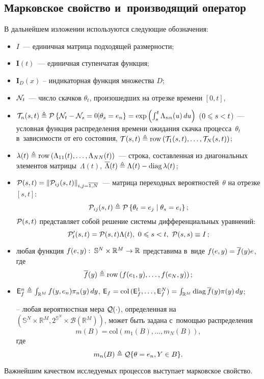 \begin{multicols}{2}
\section{Марковское свойство и~производящий оператор}

В дальнейшем изложении используются следующие обозначения:
\begin{itemize}
\item
$I$~--- единичная матрица подходящей раз\-мер\-ности;
\item
$\mathbf{I}(t)$~--- единичная ступенчатая функция;
\item
$\mathbf{I}_{D}(x)$ -- индикаторная функция множества $D$;
\item
${\mathcal N}_t$~--- число скачков $\theta_t$, произошедших на отрезке времени $[0,t]$,
\item
$\mathcal{T}_n(s,t) \ebd \pp{\NII_t-\NII_s=0|\theta_s=e_n} \hm= \exp \left( \int\nolimits_s^t 
\Lambda_{nn}(u)\,du\right)$ ($0 \hm\leqslant s \hm< t$)~--- условная функция 
распределения времени ожидания скачка процесса~$\theta_t$ в~зависимости от его 
состояния, $\mathcal{T}(s,t) \hm\ebd \mathrm{row}\, (\mathcal{T}_1(s,t),\ldots,\mathcal{T}_N(s,t))$;
\item
$\lambda(t) \triangleq \mathrm{row}\, (\Lambda_{11}(t),\ldots,\Lambda_{NN}(t))$~--- строка, 
составленная из диагональных элементов матрицы~$\Lambda(t)$, 
$\overline{\Lambda}(t) \ebd \Lambda(t) \hm- \mathrm{diag}\, \lambda(t)$;
\item
${\mathcal P}(s,t) = \|{\mathcal P}_{ij}(s,t)\|_{i,j=\overline{1,N}}$~--- матрица переходных 
вероятностей~$\theta$ на отрезке $[s,t]$:
$$
{\mathcal P}_{ij}(s,t) \triangleq \mathcal{P}\left\{ \theta_t=e_j\; | \; \theta_s=e_i \right\};
$$
 ${\mathcal P}(s,t)$ 
представляет собой решение системы дифференциальных уравнений: 
$$
{\mathcal P}'_t(s,t)= {\mathcal P}(s,t)\Lambda(t),\ 0\leqslant s < t,\ {\mathcal P}(s,s) \equiv I\,;
$$
\item
любая функция $f(e,y):\; \mathbb{S}^N \times  \mathbb{R}^M \hm\to \mathbb{R}$ 
представима в~виде $f(e,y) \hm= \overline{f}(y)e$, где
$$
\overline{f}(y) \triangleq \mathrm{row}\left(f(e_1,y), \ldots, f(e_N,y)\right);
$$
\item
$ {\sf E}_f^n \triangleq \int_{\mathbb{R}^M} f(y,e_n) \pi_n(y)\,dy$, 
${\sf E}_f \hm= \mathrm{col}\, ({\mathsf E}_f^1,\ldots,{\mathsf E}_f^N) = \int_{\mathbb{R}^M} 
\mathrm{diag}\,\overline{f}(y)\pi(y) \,dy$;
\item[--]
любая вероятностная мера ${\mathcal Q}(\cdot)$, определенная на $(\mathbb{S}^N \times  
\mathbb{R}^M ,2^{\mathbb{S}^N}\times  \mathcal{B}(\mathbb{R}^M))$, может быть 
задана с~помощью распределения 
$$
m(B) = \mathrm{col}\left(m_1(B),\ldots,m_N(B)\right),
$$
 где
$$
m_n(B) \ebd \qqq\{\theta \hm= e_n, Y \hm\in B\}.
$$
\end{itemize}
Важнейшим качеством исследуемых процессов выступает марковское свойство.


\end{multicols}
